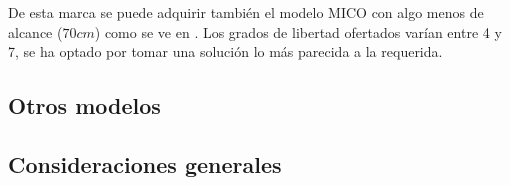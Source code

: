 	  De esta marca se puede adquirir también el modelo MICO con algo menos de alcance ($70cm$) como se ve en \cite{Mico:2018}. Los grados de libertad ofertados varían entre 4 y 7, se ha optado por tomar una solución lo más parecida a la requerida.

 \subsection{Otros modelos}
 \cite{Marquez:2013}

 \cite{Hideyuki:2010}

 \subsection{Consideraciones generales}
